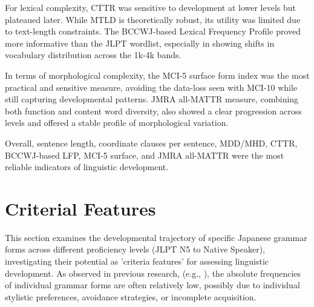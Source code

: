 For lexical complexity, CTTR was sensitive to development at lower levels but plateaued later. While MTLD is
theoretically robust, its utility was limited due to text-length constraints. The BCCWJ-based Lexical Frequency
Profile proved more informative than the JLPT wordlist, especially in showing shifts in vocabulary distribution
across the 1k-4k bands.

In terms of morphological complexity, the MCI-5 surface form index was the most practical and sensitive measure,
avoiding the data-loss seen with MCI-10 while still capturing developmental patterns. JMRA all-MATTR measure, combining
both
function and content word diversity, also showed a clear progression across levels and offered a stable profile of
morphological variation.

Overall, sentence length, coordinate clauses per sentence, MDD/MHD, CTTR, BCCWJ-based LFP, MCI-5 surface, and JMRA
all-MATTR were the most reliable indicators of linguistic development.

\section{Criterial Features}







This section examines the developmental trajectory of specific Japanese grammar forms across different proficiency
levels (JLPT N5 to Native Speaker), investigating their potential as 'criteria features' for assessing linguistic
development. As observed in previous research, (e.g., \citet{akef2025}), the absolute
frequencies of individual grammar
forms are often relatively low, possibly due to individual stylistic preferences, avoidance strategies, or incomplete
acquisition.

